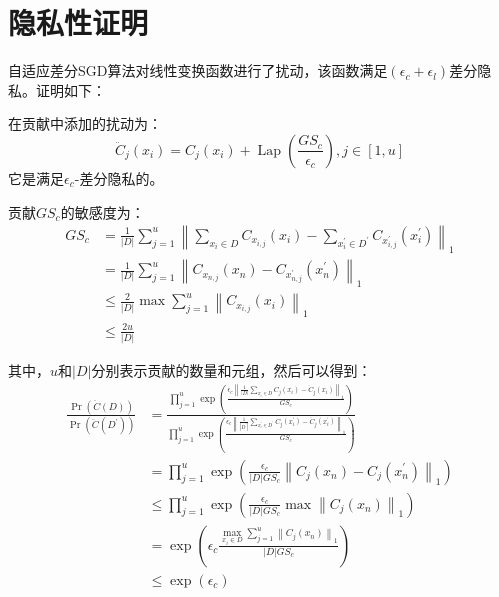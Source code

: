 \section{隐私性证明}
自适应差分SGD算法对线性变换函数进行了扰动，该函数满足$\left(\epsilon_{c}+\epsilon_{l}\right)$差分隐私。证明如下：

在贡献中添加的扰动为：
\begin{equation}\label{eq:贡献中添加的噪声}
\ddot{C}_{j}\left(x_{i}\right)=C_{j}\left(x_{i}\right)+\operatorname{Lap}\left(\frac{G S_{c}}{\epsilon_{c}}\right), j \in[1, u]
\end{equation}
它是满足$\epsilon_{c}$-差分隐私的。

贡献$G S_{c}$的敏感度为：
\begin{equation}\label{eq:贡献敏感度}
\begin{aligned}
G S_{c} &=\frac{1}{|D|} \sum_{j=1}^{u}\left\|\sum_{x_{i} \in D} C_{x_{i, j}}\left(x_{i}\right)-\sum_{x_{i}^{\prime} \in D^{\prime}} C_{x_{i, j}^{\prime}}\left(x_{i}^{\prime}\right)\right\|_{1} \\
&=\frac{1}{|D|} \sum_{j=1}^{u}\left\|C_{x_{n, j}}\left(x_{n}\right)-C_{x_{n, j}^{\prime}}\left(x_{n}^{\prime}\right)\right\|_{1} \\
& \leq \frac{2}{|D|} \max \sum_{j=1}^{u}\left\|C_{x_{i, j}}\left(x_{i}\right)\right\|_{1} \\
& \leq \frac{2 u}{|D|}
\end{aligned}
\end{equation}

其中，$u$和$|D|$分别表示贡献的数量和元组，然后可以得到：
\begin{equation}\label{贡献数量和元组}
\begin{aligned}
\frac{\operatorname{Pr}(\ddot{C}(D))}{\operatorname{Pr}\left(\ddot{C}\left(D^{\prime}\right)\right)} &=\frac{\prod_{j=1}^{u} \exp \left(\frac{\epsilon_{c}\left\|\frac{1}{|D|} \sum_{x_{i} \in D} C_{j}\left(x_{i}\right)-\ddot{C}_{j}\left(x_{i}\right)\right\|_{1}}{G S_{c}}\right)}{\prod_{j=1}^{u} \exp \left(\frac{\epsilon_{c}\left\|\frac{1}{\left|D^{\prime}\right|} \sum_{x_{i}^{\prime} \in D^{\prime}} C_{j}\left(x_{i}^{\prime}\right)-\ddot{C}_{j}\left(x_{i}^{\prime}\right)\right\|_{1}}{G S_{c}}\right)} \\
&=\prod_{j=1}^{u} \exp \left(\frac{\epsilon_{c}}{|D| G S_{c}}\left\|C_{j}\left(x_{n}\right)-C_{j}\left(x_{n}^{\prime}\right)\right\|_{1}\right) \\
& \leq \prod_{j=1}^{u} \exp \left(\frac{\epsilon_{c}}{|D| G S_{c}} \max \left\|C_{j}\left(x_{n}\right)\right\|_{1}\right) \\
&=\exp \left(\epsilon_{c} \frac{\max _{x_{i} \in D} \sum_{j=1}^{u}\left\|C_{j}\left(x_{n}\right)\right\|_{1}}{|D| G S_{c}}\right) \\
& \leq \exp \left(\epsilon_{c}\right)
\end{aligned}
\end{equation}

